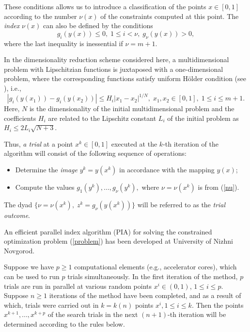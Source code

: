 \documentclass{llncs}
\begin{document}
These conditions allows us to introduce a classification of the points $x \in [0,1]$ according to 
the number $\nu (x)$ of the constraints computed at this point. The \textit{index} $\nu(x)$ can 
also be defined by the conditions
\begin{equation}\label{nu}
g_i(y(x)) \leq 0, \; 1 \leq i < \nu, \; g_\nu(y(x))>0,
\end{equation}
where the last inequality is inessential if $\nu=m+1$.

In the dimensionality reduction scheme considered here, a multidimensional problem with 
Lipschitzian functions is juxtaposed with a one-dimensional problem, where the corresponding 
functions satisfy uniform H{\"o}lder condition (see \cite{Strongin2013}), i.e.,
\[
\left|g_i(y(x_1))-g_i (y(x_2))\right| \leq H_i \left|x_1-x_2 \right|^{1/N}, \; x_1,x_2\in [0,1], \; 
1\leq i \leq m+1.
\]
Here, $N$ is the dimensionality of the initial multidimensional problem and the coefficients 
$H_i$ are related to the Lipschitz constant $L_i$ of the initial problem as $H_i \leq 2L_i 
\sqrt{N+3}$.

Thus, \textit{a trial} at a point $x^k \in [0,1]$ executed at the $k$-th iteration of the algorithm 
will consist of the following sequence of operations:
\begin{itemize}
	\item Determine the \textit{image} $y^k=y(x^k)$ in accordance with the mapping 
$y(x)$;
	\item Compute the values $g_1(y^k),..., g_\nu(y^k),$ where $\nu = \nu(x^k)$ is from 
(\ref{nu}). 
\end{itemize}
The dyad $ \{ \nu=\nu(x^k), \; z^k=g_\nu(y(x^k)) \} $ will be referred to as the \textit{trial 
outcome}.

An efficient parallel index algorithm (PIA) for solving the constrained optimization problem 
(\ref{problem}) has been developed at University of Nizhni Novgorod. 

Suppose we have $p \geq 1$  computational elements (e.g., accelerator cores), which can be used to run $p$ trials simultaneously. In the first iteration of the method, $p$ trials are run in parallel at various random points $x^i\in(0,1)$, $1\leq i \leq p$. 
Suppose $n \geq 1$  iterations of the method have been completed, and as a result of which, trials were carried out in $k=k(n)$ points $x^i, 1\leq i \leq k$. Then the points $x^{k+1},...,x^{k+p}$  of the search trials in the next $(n+1)$-th iteration will be determined according to the rules below.
\end{document}

